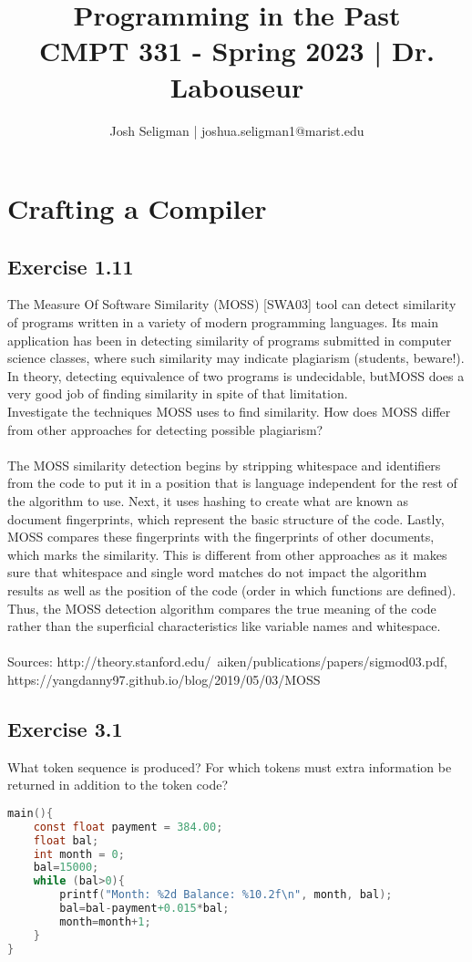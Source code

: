 \documentclass[letterpaper, 10pt, DIV=13]{scrartcl}
\title {
	\normalfont
	\huge{Programming in the Past} \\
	\vspace{10pt}
	\large{CMPT 331 - Spring 2023 | Dr. Labouseur}
}
\author{\normalfont Josh Seligman | joshua.seligman1@marist.edu}
\numberwithin{equation}{section}
\numberwithin{figure}{section}
\numberwithin{table}{section}
\begin{document}
\maketitle

\section{Crafting a Compiler}
\subsection{Exercise 1.11}
The Measure Of Software Similarity (MOSS) [SWA03] tool can detect similarity of programs written in a variety of modern programming languages. Its main application has been in detecting similarity of programs submitted in computer science classes, where such similarity may indicate plagiarism (students, beware!). In theory, detecting equivalence of two programs is undecidable, butMOSS does a very good job of finding similarity in spite of that limitation. \\ Investigate the techniques MOSS uses to find similarity. How does MOSS differ from other approaches for detecting possible plagiarism?
\\\\
The MOSS similarity detection begins by stripping whitespace and identifiers from the code to put it in a position that is language independent for the rest of the algorithm to use. Next, it uses hashing to create what are known as document fingerprints, which represent the basic structure of the code. Lastly, MOSS compares these fingerprints with the fingerprints of other documents, which marks the similarity. This is different from other approaches as it makes sure that whitespace and single word matches do not impact the algorithm results as well as the position of the code (order in which functions are defined). Thus, the MOSS detection algorithm compares the true meaning of the code rather than the superficial characteristics like variable names and whitespace.
\\\\
Sources: http://theory.stanford.edu/~aiken/publications/papers/sigmod03.pdf,\\https://yangdanny97.github.io/blog/2019/05/03/MOSS

\subsection{Exercise 3.1}
What token sequence is produced? For which tokens must extra information be returned in addition to the token code?
\begin{lstlisting}[frame=single, language=C]
main(){
    const float payment = 384.00;
    float bal;
    int month = 0;
    bal=15000;
    while (bal>0){
        printf("Month: %2d Balance: %10.2f\n", month, bal);
        bal=bal-payment+0.015*bal;
        month=month+1;
    }
}
\end{lstlisting}
\end{document}
